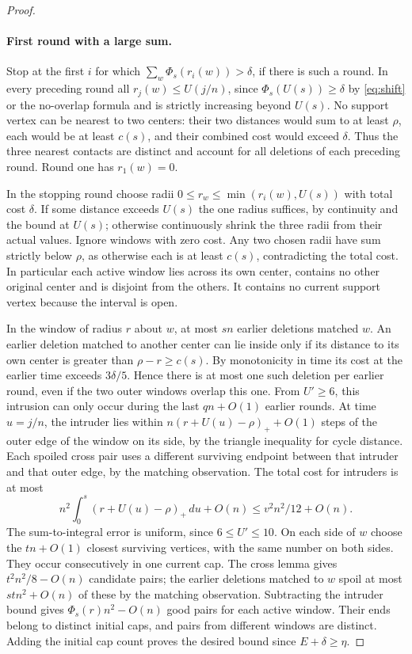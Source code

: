 \begin{proof}
\paragraph{First round with a large sum.}
Stop at the first \(i\) for which \(\sum_w\Phi_s(r_i(w))>\delta\), if there is such a round. In every preceding round all \(r_j(w)\le U(j/n)\), since \(\Phi_s(U(s))\ge\delta\) by \eqref{eq:shift} or the no-overlap formula and is strictly increasing beyond \(U(s)\). No support vertex can be nearest to two centers: their two distances would sum to at least \(\rho\), each would be at least \(c(s)\), and their combined cost would exceed \(\delta\). Thus the three nearest contacts are distinct and account for all deletions of each preceding round. Round one has \(r_1(w)=0\).

In the stopping round choose radii \(0\le r_w\le\min(r_i(w),U(s))\) with total cost \(\delta\). If some distance exceeds \(U(s)\) the one radius suffices, by continuity and the bound at \(U(s)\); otherwise continuously shrink the three radii from their actual values. Ignore windows with zero cost. Any two chosen radii have sum strictly below \(\rho\), as otherwise each is at least \(c(s)\), contradicting the total cost. In particular each active window lies across its own center, contains no other original center and is disjoint from the others. It contains no current support vertex because the interval is open.

In the window of radius \(r\) about \(w\), at most \(sn\) earlier deletions matched \(w\). An earlier deletion matched to another center can lie inside only if its distance to its own center is greater than \(\rho-r\ge c(s)\). By monotonicity in time its cost at the earlier time exceeds \(3\delta/5\). Hence there is at most one such deletion per earlier round, even if the two outer windows overlap this one. From \(U'\ge6\), this intrusion can only occur during the last \(qn+O(1)\) earlier rounds. At time \(u=j/n\), the intruder lies within \(n(r+U(u)-\rho)_++O(1)\) steps of the outer edge of the window on its side, by the triangle inequality for cycle distance. Each spoiled cross pair uses a different surviving endpoint between that intruder and that outer edge, by the matching observation. The total cost for intruders is at most
\[
 n^2\int_0^s(r+U(u)-\rho)_+\,du+O(n)\le v^2 n^2/12+O(n).
\]
The sum-to-integral error is uniform, since \(6\le U'\le10\). On each side of \(w\) choose the \(tn+O(1)\) closest surviving vertices, with the same number on both sides. They occur consecutively in one current cap. The cross lemma gives \(t^2n^2/8-O(n)\) candidate pairs; the earlier deletions matched to \(w\) spoil at most \(stn^2+O(n)\) of these by the matching observation. Subtracting the intruder bound gives \(\Phi_s(r)n^2-O(n)\) good pairs for each active window. Their ends belong to distinct initial caps, and pairs from different windows are distinct. Adding the initial cap count proves the desired bound since \(E+\delta\ge\eta\).


\end{proof}
